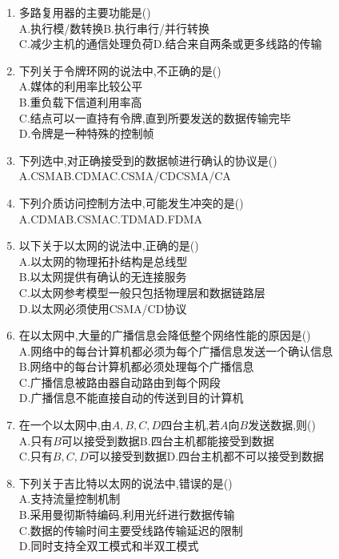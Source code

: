\documentclass[12pt, a4paper, oneside, UTF8]{ctexbook}
\begin{document}
\begin{enumerate}
    \item 多路复用器的主要功能是() \\
    A.执行模/数转换\qquad B.执行串行/并行转换 \\
    C.减少主机的通信处理负荷\qquad D.结合来自两条或更多线路的传输 

    \item 下列关于令牌环网的说法中,不正确的是() \\
    A.媒体的利用率比较公平 \\
    B.重负载下信道利用率高 \\
    C.结点可以一直持有令牌,直到所要发送的数据传输完毕 \\
    D.令牌是一种特殊的控制帧 
    
    \item \bt 下列选中,对正确接受到的数据帧进行确认的协议是()\\
    A.CSMA\qquad B.CDMA\qquad C.CSMA/CD\qquad CSMA/CA 

    \item \bt 下列介质访问控制方法中,可能发生冲突的是() \\
    A.CDMA\qquad B.CSMA\qquad C.TDMA\qquad D.FDMA

    \item 以下关于以太网的说法中,正确的是() \\
    A.以太网的物理拓扑结构是总线型 \\
    B.以太网提供有确认的无连接服务 \\
    C.以太网参考模型一般只包括物理层和数据链路层 \\
    D.以太网必须使用CSMA/CD协议

    \item 在以太网中,大量的广播信息会降低整个网络性能的原因是() \\
    A.网络中的每台计算机都必须为每个广播信息发送一个确认信息 \\
    B.网络中的每台计算机都必须处理每个广播信息 \\
    C.广播信息被路由器自动路由到每个网段 \\
    D.广播信息不能直接自动的传送到目的计算机 

    \item 在一个以太网中,由$A,B,C,D$四台主机,若$A$向$B$发送数据,则() \\
    A.只有$B$可以接受到数据\qquad B.四台主机都能接受到数据 \\
    C.只有$B,C,D$可以接受到数据\qquad D.四台主机都不可以接受到数据 

    \item 下列关于吉比特以太网的说法中,错误的是() \\
    A.支持流量控制机制 \\
    B.采用曼彻斯特编码,利用光纤进行数据传输 \\
    C.数据的传输时间主要受线路传输延迟的限制 \\
    D.同时支持全双工模式和半双工模式 
    

\end{enumerate}
\end{document}
